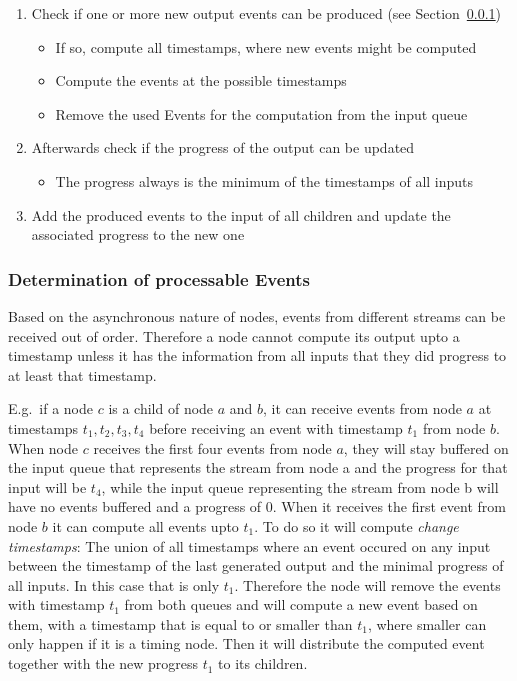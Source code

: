 \begin{enumerate}
  \item Check if one or more new output events can be produced (see Section~\ref{sec:concepts:defs:nodes:processable})
    \begin{itemize}
      \item If so, compute all timestamps, where new events might be computed
      \item Compute the events at the possible timestamps
      \item Remove the used Events for the computation from the input queue
    \end{itemize}
  \item Afterwards check if the progress of the output can be updated
    \begin{itemize}
      \item The progress always is the minimum of the timestamps of all inputs
    \end{itemize}
  \item Add the produced events to the input of all children and update the associated progress to the new one
\end{enumerate}

\subsubsection{Determination of processable Events}
\label{sec:concepts:defs:nodes:processable}

Based on the asynchronous nature of nodes, events from different streams can be received out of order.
Therefore a node cannot compute its output upto a timestamp unless it has the information from all inputs that they did progress to at least that timestamp.

E.g.\ if a node \(c\) is a child of node \(a\) and \(b\), it can receive events from node \(a\) at timestamps \(t_1, t_2, t_3, t_4\) before receiving an event with timestamp \(t_1\) from node \(b\).
When node \(c\) receives the first four events from node \(a\), they will stay buffered on the input queue that represents the stream from node a and the progress for that input will be \(t_4\), while the input queue representing the stream from node b will have no events buffered and a progress of \(0\).
When it receives the first event from node \(b\) it can compute all events upto \(t_1\).
To do so it will compute \emph{change timestamps}: The union of all timestamps where an event occured on any input between the timestamp of the last generated output and the minimal progress of all inputs.
In this case that is only \(t_1\).
Therefore the node will remove the events with timestamp \(t_1\) from both queues and will compute a new event based on them, with a timestamp that is equal to or smaller than \(t_1\), where smaller can only happen if it is a timing node.
Then it will distribute the computed event together with the new progress \(t_1\) to its children.


